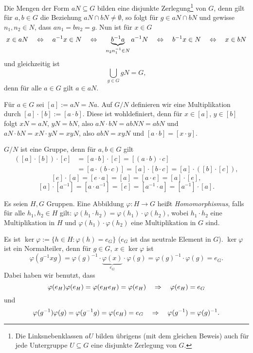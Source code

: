 \begin{rmrk*}
Die Mengen der Form $aN \subseteq G$ bilden eine disjunkte Zerlegung\footnote{Die Linksnebenklassen $aU$ bilden übrigens (mit dem gleichen Beweis) auch für jede Untergruppe $U \subseteq G$ eine disjunkte Zerlegung von $G$.} von $G$, denn gilt für $a,b \in G$ die Beziehung $aN \cap bN \ne \emptyset$, so folgt für $g \in aN \cap bN$ und gewisse $n_1, n_2 \in N$, dass $a n_1 = b n_2 = g$. Nun ist für $x \in G$
\[ x \in aN \quad \Leftrightarrow \quad a^{-1} x \in N \quad \Leftrightarrow \quad \underbrace{b^{-1} a}_{n_2 n_1^{-1} \in N} a^{-1} N \quad \Leftrightarrow \quad b^{-1} x \in N \quad \Leftrightarrow \quad x \in bN \]
und gleichzeitig ist
\[ \bigcup_{g \in G} g N = G, \]
denn für alle $a \in G$ gilt $a \in aN$.
\end{rmrk*}

Für $a \in G$ sei $[a] := aN = Na$. Auf $G / N$ definieren wir eine Multiplikation durch $[a] \cdot [b] := [a \cdot b]$. Diese ist wohldefiniert, denn für $x \in [a]$, $y \in [b]$ folgt $xN = aN$, $yN = bN$, also $aN \cdot bN = a bN N = ab N$ und $aN \cdot bN = xN \cdot yN = xy N$, also $ab N = xy N$ und $[a \cdot b] = [x \cdot y]$.

$G/N$ ist eine Gruppe, denn für $a,b \in G$ gilt
\[ \begin{aligned}
    ( [a] \cdot [b] ) \cdot [c] &= [a \cdot b ] \cdot [c] = [ (a \cdot b ) \cdot c ] \\
    &= [ a \cdot (b  \cdot c ) ] = [a] \cdot [b \cdot c ] = [a] \cdot ( [b] \cdot [c] ),
   \end{aligned} \]
\[ [e] \cdot [a] = [e \cdot a ] = [ a ] = [a \cdot e] = [a] \cdot [e],\]
\[ [a] \cdot [a^{-1}] = [a \cdot a^{-1}] = [e] = [a^{-1} \cdot a] = [a^{-1}] \cdot [a]. \]

Es seien $H,G$ Gruppen. Eine Abbildung $\varphi: H \to G$ heißt \emph{Homomorphismus}, falls für alle $h_1, h_2 \in H$ gilt: $\varphi( h_1 \cdot h_2 ) = \varphi( h_1 ) \cdot \varphi(h_2)$, wobei $h_1 \cdot h_2$ eine Multiplikation in $H$ und $\varphi( h_1 ) \cdot \varphi(h_2)$ eine Multiplikation in $G$ sind.

Es ist $\ker \varphi := \{ h \in H : \varphi(h) = e_G \}$ ($e_G$ ist das neutrale Element in $G$). $\ker \varphi$ ist ein Normalteiler, denn für $g \in G$, $x \in \ker \varphi$ ist
\[ \varphi( g^{-1} x g ) = \varphi( g )^{-1} \cdot \underbrace{\varphi(x)}_{e_G} \cdot \varphi( g ) =  \varphi( g )^{-1} \cdot \varphi( g ) = e_G. \]
Dabei haben wir benutzt, dass
\[ \varphi( e_H ) \varphi( e_H ) = \varphi( e_H e_H ) = \varphi( e_H ) \quad \Rightarrow \quad \varphi( e_H ) = e_G \]
und
\[ \varphi( g^{-1} ) \varphi( g ) = \varphi( g^{-1} g ) = \varphi( e_H ) = e_G \quad \Rightarrow \quad \varphi( g^{-1} ) = \varphi( g)^{-1}. \]

